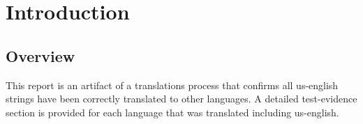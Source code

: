 \section{Introduction}
\subsection{Overview}
This report is an artifact of a translations process that confirms all
us-english strings have been correctly translated to other languages.
A detailed test-evidence section is provided for each language that was
translated including us-english.
